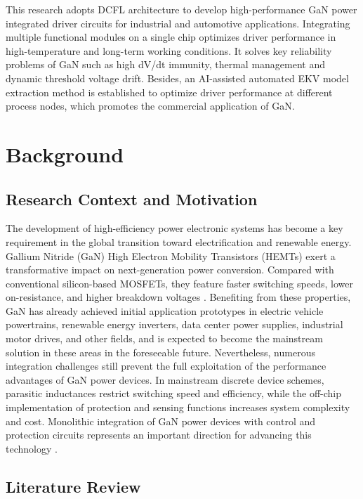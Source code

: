 \documentclass[12pt,a4paper]{article}
\begin{document}
This research adopts DCFL architecture to develop high-performance GaN power integrated driver circuits for industrial and automotive applications. Integrating multiple functional modules on a single chip optimizes driver performance in high-temperature and long-term working conditions. It solves key reliability problems of GaN such as high dV/dt immunity, thermal management and dynamic threshold voltage drift. Besides, an AI-assisted automated EKV model extraction method is established to optimize driver performance at different process nodes, which promotes the commercial application of GaN.

\section{Background}

\subsection{Research Context and Motivation}

The development of high-efficiency power electronic systems has become a key requirement in the global transition toward electrification and renewable energy. Gallium Nitride (GaN) High Electron Mobility Transistors (HEMTs) exert a transformative impact on next-generation power conversion. Compared with conventional silicon-based MOSFETs, they feature faster switching speeds, lower on-resistance, and higher breakdown voltages \cite{gao2024gan}. Benefiting from these properties, GaN has already achieved initial application prototypes in electric vehicle powertrains, renewable energy inverters, data center power supplies, industrial motor drives, and other fields, and is expected to become the mainstream solution in these areas in the foreseeable future.
Nevertheless, numerous integration challenges still prevent the full exploitation of the performance advantages of GaN power devices. In mainstream discrete device schemes, parasitic inductances restrict switching speed and efficiency, while the off-chip implementation of protection and sensing functions increases system complexity and cost. Monolithic integration of GaN power devices with control and protection circuits represents an important direction for advancing this technology \cite{liu2024monolithic}.

\subsection{Literature Review}
\end{document}
